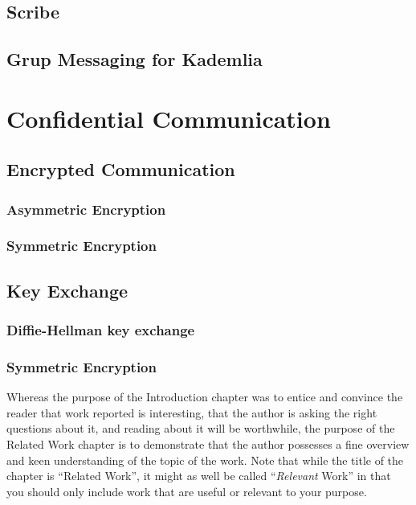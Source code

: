 \subsection{Scribe}
\subsection{Grup Messaging for Kademlia}

\section{Confidential Communication}
\subsection{Encrypted Communication}
\subsubsection{Asymmetric Encryption}
\subsubsection{Symmetric Encryption}

\subsection{Key Exchange}
\subsubsection{Diffie-Hellman key exchange}
\subsubsection{Symmetric Encryption}








Whereas the purpose of the Introduction chapter was to entice and
convince the reader that work reported is interesting, that the author
is asking the right questions about it, and reading about it will be
worthwhile, the purpose of the Related Work chapter is to
demonstrate that the author possesses a fine overview and keen
understanding of the topic of the work.  Note that while the title of
the chapter is ``Related Work'', it might as well be called
``\emph{Relevant} Work'' in that you should only include work that are
useful or relevant to your purpose. 

